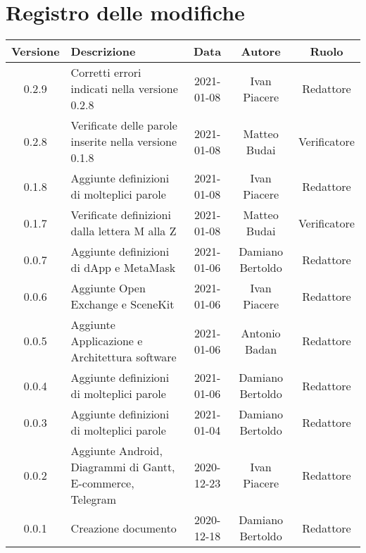 \section*{Registro delle modifiche}

\begin{center}
	\begin{longtable}{|c|p{5cm}|c|c|c|}
	\hline
	\rowcolor{lighter-grayer}
	\textbf{Versione} & \textbf{Descrizione} & \textbf{Data} & \textbf{Autore} & \textbf{Ruolo} \\
	\hline
	\endfirsthead

	0.2.9 & Corretti errori indicati nella versione 0.2.8 & 2021-01-08 & Ivan Piacere & Redattore \\
	\hline
	0.2.8 & Verificate delle parole inserite nella versione 0.1.8 & 2021-01-08 & Matteo Budai & Verificatore \\
	\hline
	0.1.8 & Aggiunte definizioni di molteplici parole & 2021-01-08 & Ivan Piacere & Redattore \\
	\hline
	0.1.7 & Verificate definizioni dalla lettera M alla Z & 2021-01-08 & Matteo Budai & Verificatore \\
	\hline
	0.0.7 & Aggiunte definizioni di dApp e MetaMask & 2021-01-06 & Damiano Bertoldo & Redattore \\
	\hline
	0.0.6 & Aggiunte Open Exchange e SceneKit & 2021-01-06 & Ivan Piacere & Redattore \\
	\hline
	0.0.5 & Aggiunte Applicazione e Architettura software & 2021-01-06 & Antonio Badan & Redattore \\
	\hline
	0.0.4 & Aggiunte definizioni di molteplici parole & 2021-01-06 & Damiano Bertoldo & Redattore \\
	\hline
	0.0.3 & Aggiunte definizioni di molteplici parole & 2021-01-04 & Damiano Bertoldo & Redattore \\
	\hline
	0.0.2 & Aggiunte Android, Diagrammi di Gantt, E-commerce, Telegram & 2020-12-23 & Ivan Piacere & Redattore \\
	\hline
	0.0.1 & Creazione documento & 2020-12-18 & Damiano Bertoldo & Redattore \\
	\hline

	\end{longtable}
\end{center}